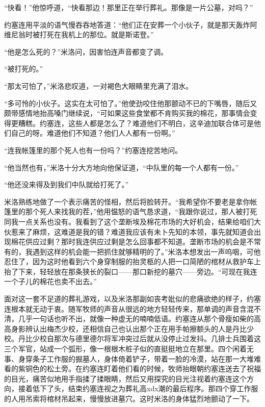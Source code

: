     “快看！”他惊呼道，“快看那边！那里正在举行葬礼。那像是一片公墓，对吗？”

    约塞连用平淡的语气慢吞吞地答道：“他们正在安葬一个小伙子，就是那天轰炸阿维尼翁时被打死在我机上的那位。就是斯诺登。”

    “他是怎么死的？”米洛问，因害怕连声音都变了调。

    “被打死的。”

    “那太可怕了，”米洛悲叹道，一对褐色大眼睛里充满了泪水。

    “多可怜的小伙子。这实在太可怕了。”他使劲咬住他那颤动不已的下嘴唇，随后又颇带感情地抬高嗓门继续说，“可如果这些食堂都不肯购买我的棉花，那事情会变得更糟糕。约塞连，这些人都是怎么了？难道他们不明白，这辛迪加联合体可是他们自己的呀。难道他们不知道？他们人人都有一份啊。”

    “连我帐篷里的那个死人也有一份吗？”约塞连挖苦地问。

    “他当然也有，”米洛十分大方地向他保证道，“中队里的每一个人都有一份。”

    “他还没来得及到我们中队就给打死了。”

    米洛熟练地做了一个表示痛苦的怪相，然后将脸转开。“我希望你不要老是拿你帐篷里的那个死人来找我的茬，”他用愠怒的语气恳求道，“我跟你说过，那人被打死同我一点关系也没有。我看到了这个垄断埃及棉花市场的大好机会，结果给咱们大伙惹来了麻烦，这难道是我的错？难道我应该有未卜先知的本领，事先就知道会出现棉花供应过剩？那时我连供应过剩是怎么回事都不知道。垄断市场的机会是不常有的，我遇到这样的机会能一把抓住就够精明的了。”米洛本想发出一声呜咽，可他忍住了，因为这时他看到六个身穿制服的抬灵柩的人把一口简陋的棺材从救护车上抬了下来，轻轻放在那条狭长的裂口——那口新挖的墓穴——旁边。“可现在我连一个子儿的棉花也卖不出去。”

    面对这一套不足道的葬礼游戏，以及米洛那副如丧考妣似的悲痛欲绝的样子，约塞连根本就无动于衷。随军牧师的声音从很远的地方轻轻传来，那单调的声音含混不清，几乎一句话也听不出，就像一种虚无的喃喃低语。约塞连从那个骨瘦如柴的高高身影辨认出梅杰少校，还相信自己也认出那个正在用手帕擦额头的人是丹比少校。丹比少校自那次与德里德尔将军冲突过后就从没停止过发抖。几排士兵围着这三个军官，站成一个弧形，像一根根木桩子似的直挺挺地立在那里。四个闲着无事、身穿条子工作服的掘墓人，身体倚着铲子，带着一脸的冷漠，站在那一大堆难看的紫铜色的松土旁。在约塞连盯着他们看的时候，牧师抬眼朝约塞连送去了祝福的目光，痛苦似地用手指揉了揉眼睛，然后又用探究的目光注视着约塞连这个方向，接着低下了头，结束约塞连视之为葬礼高xdx潮的最后程序。那四个穿工作服的人用吊索将棺材吊起来，慢慢放进墓穴。这时米洛的身体猛烈地颤动了一下。

